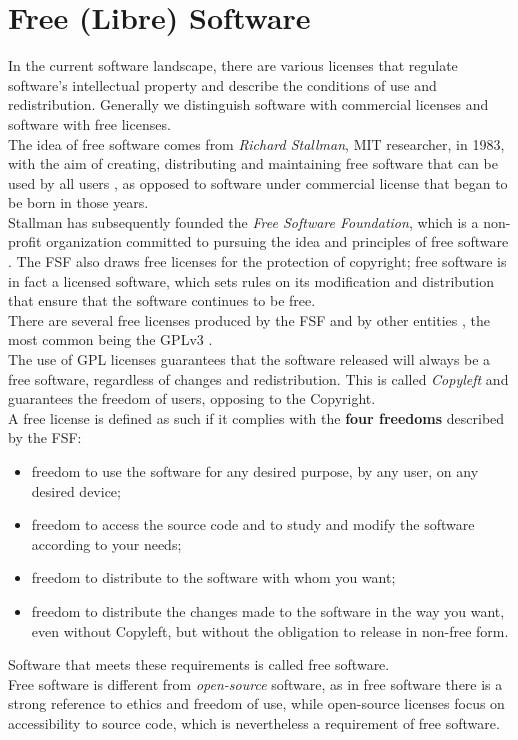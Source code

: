 
\chapter{Free (Libre) Software} %

\label{Capitolo1} %

In the current software landscape, there are various licenses that regulate software's intellectual property and describe the conditions of use and redistribution. Generally we distinguish software with commercial licenses and software with free licenses. \\
The idea of free software comes from \emph{Richard Stallman}, MIT researcher, in 1983, with the aim of creating, distributing and maintaining free software that can be used by all users \parencite{Reference57}, as opposed to software under commercial license that began to be born in those years.\\
Stallman has subsequently founded the \emph{Free Software Foundation}, which is a non-profit organization committed to pursuing the idea and principles of free software \parencite{Reference58}. The FSF also draws free licenses for the protection of copyright; free software is in fact a licensed software, which sets rules on its modification and distribution that ensure that the software continues to be free. \\ There are several free licenses produced by the FSF \parencite{Reference59} and by other entities \parencite{Reference60}, the most common being the GPLv3 \parencite{Reference61}.\\
The use of GPL licenses guarantees that the software released will always be a free software, regardless of changes and redistribution. This is called \emph{Copyleft} and guarantees the freedom of users, opposing to the Copyright.\\
A free license is defined as such if it complies with the \textbf{four freedoms} described by the FSF: \\
\begin{itemize}
\item freedom to use the software for any desired purpose, by any user, on any desired device;
\item freedom to access the source code and to study and modify the software according to your needs;
\item freedom to distribute to the software with whom you want;
\item freedom to distribute the changes made to the software in the way you want, even without Copyleft, but without the obligation to release in non-free form.
\end{itemize}
Software that meets these requirements is called free software. \\
Free software is different from \emph{open-source} software, as in free software there is a strong reference to ethics and freedom of use, while open-source licenses focus on accessibility to source code, which is nevertheless a requirement of free software.


